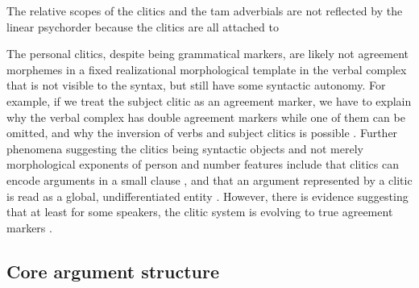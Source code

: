 \documentclass[a4paper, oneside, 12pt]{report}
\newcommand*{\citepage}[1]{p.~{#1}}
\begin{document}
The relative scopes of the clitics and the \ac{tam} adverbials are not reflected by the linear psychorder because the clitics are all attached to

The personal clitics, despite being grammatical markers,
are likely not agreement morphemes in a fixed realizational morphological template in the verbal complex
that is not visible to the syntax,
but still have some syntactic autonomy.
For example, if we treat the subject clitic as an agreement marker,
we have to explain why the verbal complex has double agreement markers
while one of them can be omitted,
and why the inversion of verbs and subject clitics is possible
\citep{de2005french}.
Further phenomena suggesting the clitics being syntactic objects
and not merely morphological exponents of person and number features
include that clitics can encode arguments in a small clause 
\citep{sportiche2005clitic},
and that an argument represented by a clitic is read as a global, undifferentiated entity
\citep[\citepage{131}]{rowlett2007syntax}.
However, there is evidence suggesting that at least for some speakers,
the clitic system is evolving to true agreement markers
\citep{culbertson2010convergent}.

\subsection{Core argument structure}
\end{document}
